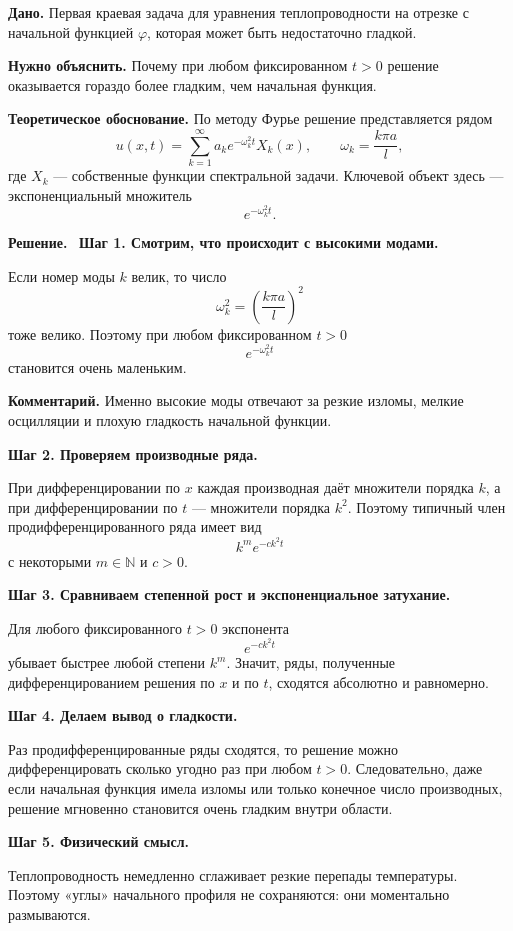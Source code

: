 \documentclass[a4paper,12pt]{article}
\newcommand{\Solution}{\textbf{Решение.}\ }
\begin{document}
\textbf{Дано.}
Первая краевая задача для уравнения теплопроводности на отрезке с начальной функцией $\varphi$, которая может быть недостаточно гладкой.

\textbf{Нужно объяснить.}
Почему при любом фиксированном $t>0$ решение оказывается гораздо более гладким, чем начальная функция.

\textbf{Теоретическое обоснование.}
По методу Фурье решение представляется рядом
\[
u(x,t)=\sum_{k=1}^{\infty}
a_ke^{-\omega_k^2t}X_k(x),
\qquad
\omega_k=\frac{k\pi a}{l},
\]
где $X_k$ --- собственные функции спектральной задачи. Ключевой объект здесь --- экспоненциальный множитель
\[
e^{-\omega_k^2t}.
\]

\Solution
\textbf{Шаг 1. Смотрим, что происходит с высокими модами.}

Если номер моды $k$ велик, то число
\[
\omega_k^2=\left(\frac{k\pi a}{l}\right)^2
\]
тоже велико. Поэтому при любом фиксированном $t>0$
\[
e^{-\omega_k^2t}
\]
становится очень маленьким.

\textbf{Комментарий.} Именно высокие моды отвечают за резкие изломы, мелкие осцилляции и плохую гладкость начальной функции.

\textbf{Шаг 2. Проверяем производные ряда.}

При дифференцировании по $x$ каждая производная даёт множители порядка $k$, а при дифференцировании по $t$ --- множители порядка $k^2$. Поэтому типичный член продифференцированного ряда имеет вид
\[
k^m e^{-ck^2t}
\]
с некоторыми $m\in\mathbb{N}$ и $c>0$.

\textbf{Шаг 3. Сравниваем степенной рост и экспоненциальное затухание.}

Для любого фиксированного $t>0$ экспонента
\[
e^{-ck^2t}
\]
убывает быстрее любой степени $k^m$. Значит, ряды, полученные дифференцированием решения по $x$ и по $t$, сходятся абсолютно и равномерно.

\textbf{Шаг 4. Делаем вывод о гладкости.}

Раз продифференцированные ряды сходятся, то решение можно дифференцировать сколько угодно раз при любом $t>0$. Следовательно, даже если начальная функция имела изломы или только конечное число производных, решение мгновенно становится очень гладким внутри области.

\textbf{Шаг 5. Физический смысл.}

Теплопроводность немедленно сглаживает резкие перепады температуры. Поэтому «углы» начального профиля не сохраняются: они моментально размываются.
\end{document}
